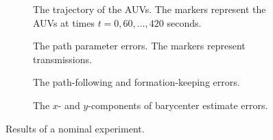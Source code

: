 \begin{figure}[p]
    \begin{minipage}{0.48\textwidth}
        \begin{subfigure}{\textwidth}
            
            \vspace{-3mm}
            \caption{The trajectory of the AUVs. The markers represent the AUVs at times $t = 0, 60, \ldots, 420$ seconds.}
            \label{fig:distr_NSB_experiment_nominal_trajectory}
        \end{subfigure}


        \begin{subfigure}{\textwidth}
            
            \vspace{-7mm}
            \caption{The path parameter errors. The markers represent transmissions.}
            \label{fig:distr_NSB_experiment_nominal_parameter}
        \end{subfigure}
    \end{minipage}
    \hspace{\fill}
    \begin{minipage}{0.48\textwidth}

        \hspace*{\fill}
        \begin{subfigure}{\textwidth}
            \hspace*{-5mm}
            
            \vspace{-7mm}
            \caption{The path-following and formation-keeping errors.}
            \label{fig:distr_NSB_experiment_nominal_errors}
        \end{subfigure}


        \hspace*{\fill}
        \begin{subfigure}{\textwidth}
            \hspace*{-5mm}
            
            \vspace{-7mm}
            \caption{The $x$- and $y$-components of barycenter estimate errors.}
            \label{fig:distr_NSB_experiment_nominal_barycenter}
        \end{subfigure}
    \end{minipage}

    \caption{Results of a nominal experiment.}
    \label{fig:distr_NSB_experiment_nominal}
\end{figure}
